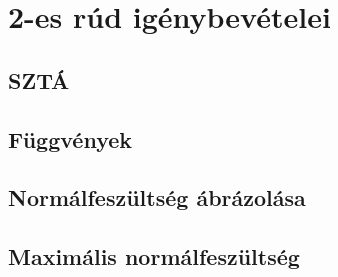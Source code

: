 \section{2-es rúd igénybevételei}

\subsection{SZTÁ}

\newpage

\subsection{Függvények}

\newpage

\subsection{Normálfeszültség ábrázolása}

\subsection{Maximális normálfeszültség}
